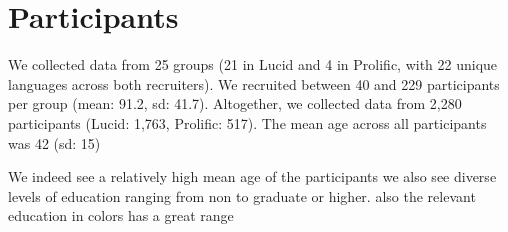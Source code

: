 \section{Participants}

We collected data from 25 groups (21 in Lucid and 4 in Prolific, with 22 unique languages across both recruiters).
We recruited between 40 and 229 participants per group (mean: 91.2, sd: 41.7). 
Altogether, we collected data from 2,280 participants (Lucid: 1,763, Prolific: 517). 
The mean age across all participants was 42 (sd: 15)


We indeed see a relatively high mean age of the participants
we also see diverse levels of education ranging from non to graduate or higher. 
also the relevant education in colors has a great range
